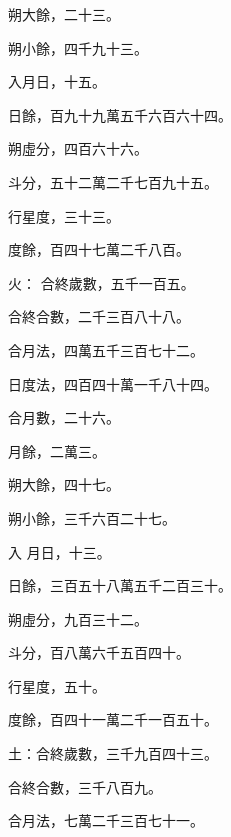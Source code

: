 \begin{pinyinscope}
 朔大餘，二十三。



 朔小餘，四千九十三。



 入月日，十五。



 日餘，百九十九萬五千六百六十四。



 朔虛分，四百六十六。



 斗分，五十二萬二千七百九十五。



 行星度，三十三。



 度餘，百四十七萬二千八百。



 火：
 合終歲數，五千一百五。



 合終合數，二千三百八十八。



 合月法，四萬五千三百七十二。



 日度法，四百四十萬一千八十四。



 合月數，二十六。



 月餘，二萬三。



 朔大餘，四十七。



 朔小餘，三千六百二十七。



 入
 月日，十三。



 日餘，三百五十八萬五千二百三十。



 朔虛分，九百三十二。



 斗分，百八萬六千五百四十。



 行星度，五十。



 度餘，百四十一萬二千一百五十。



 土：合終歲數，三千九百四十三。



 合終合數，三千八百九。



 合月法，七萬二千三百七十一。




\end{pinyinscope}
